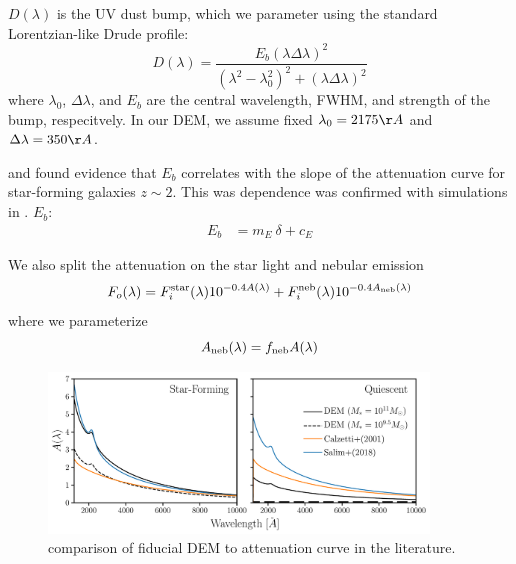 $D(\lambda)$ is the UV dust bump, which we
parameter using the standard Lorentzian-like Drude profile:
\begin{equation}
    D(\lambda) = \frac{E_b(\lambda \Delta \lambda)^2}{(\lambda^2 -
    \lambda_0^2)^2 + (\lambda \Delta \lambda)^2}
\end{equation}
where $\lambda_0$, $\Delta \lambda$, and $E_b$ are the central wavelength,
FWHM, and strength of the bump, respecitvely. In our DEM, we assume fixed 
$\lambda_0 = 2175 \AA$ and $\Delta \lambda = 350\AA$. 

\cite{kriek2013} and \cite{tress2018} found evidence that $E_b$ correlates with
the slope of the attenuation curve for star-forming galaxies $z\sim2$. This was
dependence was confirmed with simulations in \cite{naranyanan2018}. $E_b$: 
\begin{align}
    E_b &= m_E~\delta + c_E
\end{align}

We also split the attenuation on the star light and nebular emission 
\begin{equation} 
    F_o (\lambda) = F^{\rm star}_i (\lambda) 10^{-0.4 A(\lambda)} + F^{\rm
    neb}_i (\lambda) 10^{-0.4 A_{\rm neb}(\lambda)}
\end{equation}
where we parameterize
\begin{equation}
    A_{\rm neb}(\lambda) = f_{\rm neb}  A(\lambda) 
\end{equation} 


\begin{figure}
\begin{center}
    \includegraphics[width=0.9\textwidth]{figs/dems.pdf}
    \caption{comparison of fiducial DEM to attenuation curve in the literature.}
\label{fig:dem}
\end{center}
\end{figure}



